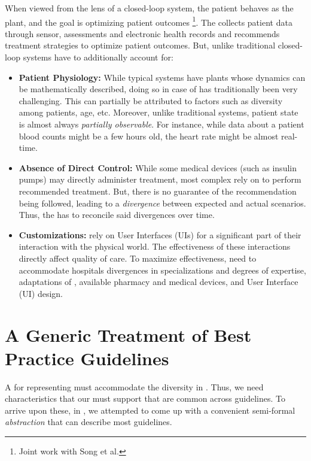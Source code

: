 When viewed from the lens of a closed-loop system, the patient behaves
as the plant, and the goal is optimizing patient outcomes
\cite{SongSMC23}\footnote{Joint work with Song et al.}. The \CDSSs{}
collects patient data through sensor, assessments and electronic
health records and recommends treatment strategies to optimize patient
outcomes. But, unlike traditional closed-loop systems
\CDSSs{} have to additionally account for:
\begin{itemize}
  \item \textbf{Patient Physiology:} While typical systems have
  plants whose dynamics can be mathematically described, doing so
  in case of \CDSSs{} has traditionally been very challenging. This
  can partially be attributed to factors such as diversity among patients,
  age, etc. Moreover, unlike traditional systems, patient state is
  almost always \emph{partially observable}. For instance,
  while data about a patient blood counts might be a few hours old,
  the heart rate might be almost real-time.
  \item \textbf{Absence of Direct Control:} While some medical devices
  (such as insulin pumps) may directly administer treatment, most
  complex \CDSSs{} rely on \HCPs{} to perform recommended treatment.
  But, there is no guarantee of the recommendation being followed,
  leading to a \emph{divergence} between expected and actual scenarios.
  Thus, the \CDSS{} has to reconcile said divergences over time.
  \item \textbf{Customizations:} \CDSSs{} rely on User Interfaces (UIs) for
  a significant part of their interaction with the physical world.
  The effectiveness of these interactions directly affect quality of care.
  To maximize effectiveness, \CDSSs{} need to accommodate
  hospitals divergences in specializations and
  degrees of expertise, adaptations of \BPGs{}, available pharmacy and medical devices,
  and User Interface (UI) design.
\end{itemize}

\section{A Generic Treatment of Best Practice Guidelines}

A \DSL{} for representing \BPGs{} must accommodate the diversity
in \BPGs{}. Thus, we need characteristics that our \DSL{} must
support that are common across guidelines. To arrive upon these,
in \cite{SongSMC23}, we attempted
to come up with a convenient semi-formal \emph{abstraction}
that can describe most guidelines.

